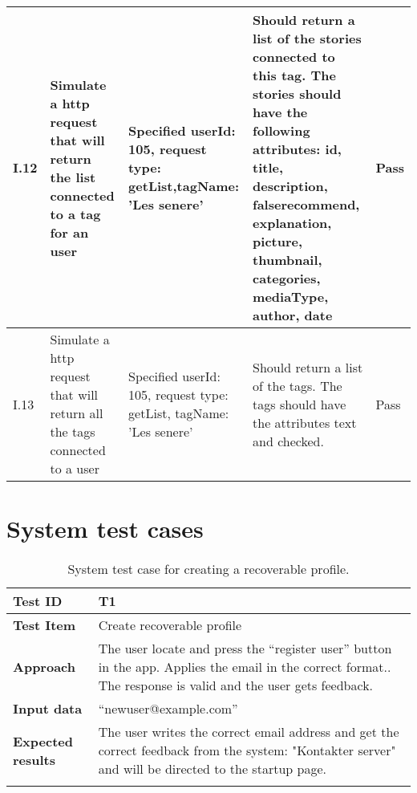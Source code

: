 \begin{appendices}
\begin{center}
\begin{longtable}{ | p{1cm} | p{5.5cm} | p{4cm} | p{4.5cm} | p{2cm}|}
		
		I.12 & Simulate a http request that will return the list connected to a tag for an user  & Specified userId: 105, request type: getList,\newline tagName: 'Les senere' & Should return a list of the stories connected to this tag. The stories should have the following attributes: id, title, description, false\textunderscore recommend, explanation, picture, thumbnail, categories, mediaType, author, date & Pass\\ \hline					
		
		
		I.13 & Simulate a http request that will return all the tags connected to a user  & Specified userId: 105, \newline request type: getList, \newline tagName: 'Les senere' & Should return a list of the tags. The tags should have the attributes text and checked. & Pass\\ \hline	
		
	\end{longtable}
\end{center}
\raggedbottom
\newpage		

\chapter{System test cases}

\begin{table}[H]
	\centering
	\caption{System test case for creating a recoverable profile.}
	\begin{tabular}[b]{ | l | l  |}
			\hline
			\textbf{Test ID} & T1  \\ \hline
			\textbf{Test Item} & Create recoverable profile \\ \hline
			\textbf{Approach} & \begin{minipage}{5in}The user locate and press the “register user” button in the app. Applies the email in the correct format.. The response is valid and the user gets feedback. \end{minipage}\\ \hline
			\textbf{Input data} &  “newuser@example.com”\\ \hline
			
			\textbf{Expected results} & \begin{minipage}{5in}The user writes the correct email address and get the correct feedback from the system: "Kontakter server" and will be directed to the startup page.\end{minipage}\\ \hline&\\[-3.8ex]
		

\end{tabular}
\end{table}
\end{appendices}
